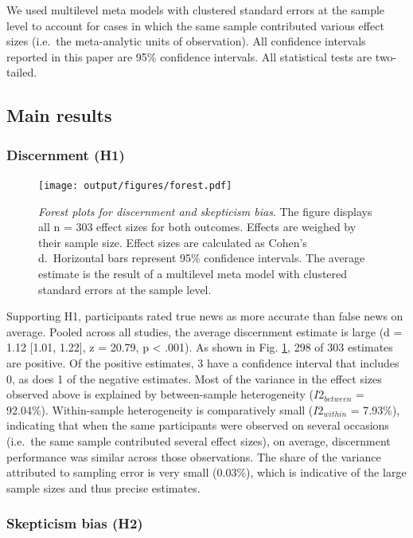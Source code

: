 \documentclass[
  man]{apa6}
\begin{document}
We used multilevel meta models with clustered standard errors at the sample level to account for cases in which the same sample contributed various effect sizes (i.e.~the meta-analytic units of observation). All confidence intervals reported in this paper are 95\% confidence intervals. All statistical tests are two-tailed.

\subsection{Main results}\label{main-results}

\subsubsection{Discernment (H1)}\label{discernment-h1}



\begin{figure}
\centering
\texttt{[image: output/figures/forest.pdf]}
\caption{\label{fig:forest}\emph{Forest plots for discernment and skepticism bias}. The figure displays all n = 303 effect sizes for both outcomes. Effects are weighed by their sample size. Effect sizes are calculated as Cohen's d.~Horizontal bars represent 95\% confidence intervals. The average estimate is the result of a multilevel meta model with clustered standard errors at the sample level.}
\end{figure}

Supporting H1, participants rated true news as more accurate than false news on average. Pooled across all studies, the average discernment estimate is large (d = 1.12 {[}1.01, 1.22{]}, z = 20.79, p \textless{} .001). As shown in Fig. \ref{fig:forest}, 298 of 303 estimates are positive. Of the positive estimates, 3 have a confidence interval that includes 0, as does 1 of the negative estimates. Most of the variance in the effect sizes observed above is explained by between-sample heterogeneity (\(I2_{between}\) = 92.04\%). Within-sample heterogeneity is comparatively small (\(I2_{within}\) = 7.93\%), indicating that when the same participants were observed on several occasions (i.e.~the same sample contributed several effect sizes), on average, discernment performance was similar across those observations. The share of the variance attributed to sampling error is very small (0.03\%), which is indicative of the large sample sizes and thus precise estimates.

\subsubsection{Skepticism bias (H2)}\label{skepticism-bias-h2}
\end{document}
